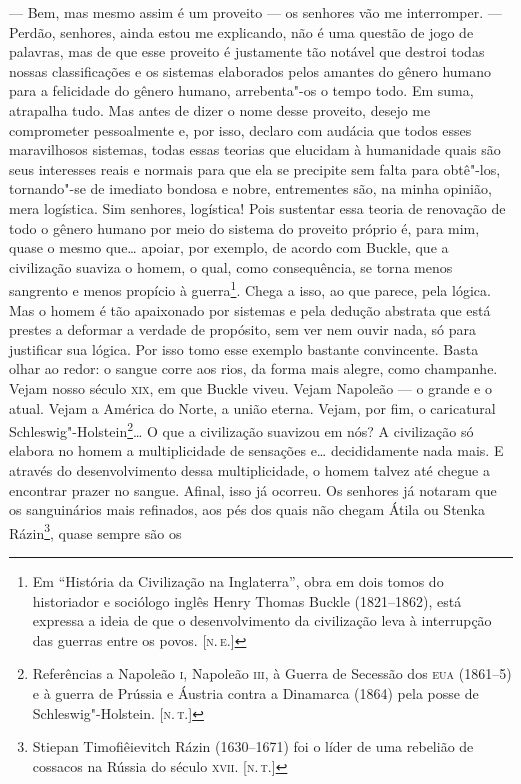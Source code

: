 --- Bem, mas mesmo assim é um proveito --- os senhores vão me interromper.
--- Perdão, senhores, ainda estou me explicando, não é uma questão de jogo
de palavras, mas de que esse proveito é justamente tão notável que
destroi todas nossas classificações e os sistemas elaborados pelos
amantes do gênero humano para a felicidade do gênero humano,
arrebenta"-os o tempo todo. Em suma, atrapalha tudo. Mas antes de dizer o
nome desse proveito, desejo me comprometer pessoalmente e, por isso,
declaro com audácia que todos esses maravilhosos sistemas, todas essas
teorias que elucidam à humanidade quais são seus interesses reais e
normais para que ela se precipite sem falta para obtê"-los, tornando"-se
de imediato bondosa e nobre, entrementes são, na minha opinião, mera
logística. Sim senhores, logística! Pois sustentar essa teoria de
renovação de todo o gênero humano por meio do sistema do proveito
próprio é, para mim, quase o mesmo que\ldots{} apoiar, por exemplo, de acordo
com Buckle, que a civilização suaviza o homem, o qual, como
consequência, se torna menos sangrento e menos propício à
guerra\footnote{Em ``História da Civilização na Inglaterra'', obra em
  dois tomos do historiador e sociólogo inglês Henry Thomas Buckle
  (1821--1862), está expressa a ideia de que o desenvolvimento da
  civilização leva à interrupção das guerras entre os povos. {[}\textsc{n.\,e.}{]}}.
Chega a isso, ao que parece, pela lógica. Mas o homem é tão apaixonado
por sistemas e pela dedução abstrata que está prestes a deformar a
verdade de propósito, sem ver nem ouvir nada, só para justificar sua
lógica. Por isso tomo esse exemplo bastante convincente. Basta olhar ao
redor: o sangue corre aos rios, da forma mais alegre, como champanhe.
Vejam nosso século \textsc{xix}, em que Buckle viveu. Vejam Napoleão --- o grande
e o atual. Vejam a América do Norte, a união eterna. Vejam, por fim, o
caricatural Schleswig"-Holstein\footnote{Referências a Napoleão \textsc{i},
  Napoleão \textsc{iii}, à Guerra de Secessão dos \textsc{eua} (1861--5) e à guerra de
  Prússia e Áustria contra a Dinamarca (1864) pela posse de
  Schleswig"-Holstein. {[}\textsc{n.\,t.}{]}}\ldots{} O que a civilização suavizou em
nós? A civilização só elabora no homem a multiplicidade de sensações
e\ldots{} decididamente nada mais. E através do desenvolvimento dessa
multiplicidade, o homem talvez até chegue a encontrar prazer no sangue.
Afinal, isso já ocorreu. Os senhores já notaram que os sanguinários mais
refinados, aos pés dos quais não chegam Átila ou Stenka Rázin\footnote{Stiepan
  Timofiêievitch Rázin (1630--1671) foi o líder de uma rebelião de
  cossacos na Rússia do século \textsc{xvii}. {[}\textsc{n.\,t.}{]}}, quase sempre são os

